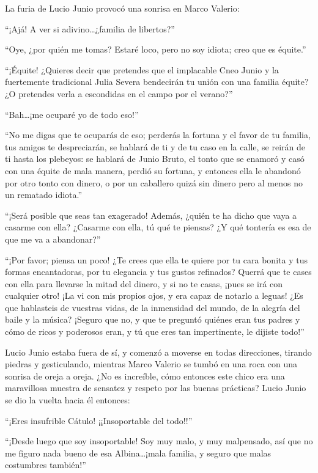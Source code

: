 \documentclass[11pt,openany]{book}
\begin{document}
La furia de Lucio Junio provocó una sonrisa en Marco Valerio:

“¡Ajá! A ver si adivino\dots ¿familia de libertos?”

“Oye, ¿por quién me tomas? Estaré loco, pero no soy idiota; creo que es équite.”

“¡Équite! ¿Quieres decir que pretendes que el implacable Cneo Junio y la fuertemente tradicional Julia Severa bendecirán tu unión con una familia équite? ¿O pretendes verla a escondidas en el campo por el verano?”

“Bah\dots ¡me ocuparé yo de todo eso!”

“No me digas que te ocuparás de eso; perderás la fortuna y el favor de tu familia, tus amigos te despreciarán, se hablará de ti y de tu caso en la calle, se reirán de ti hasta los plebeyos: se hablará de Junio Bruto, el tonto que se enamoró y casó con una équite de mala manera, perdió su fortuna, y entonces ella le abandonó por otro tonto con dinero, o por un caballero quizá sin dinero pero al menos no un rematado idiota.”

“¡Será posible que seas tan exagerado! Además, ¿quién te ha dicho que vaya a casarme con ella? ¿Casarme con ella, tú qué te piensas? ¿Y qué tontería es esa de que me va a abandonar?” 

“¡Por favor; piensa un poco! ¿Te crees que ella te quiere por tu cara bonita y tus formas encantadoras, por tu elegancia y tus gustos refinados? Querrá que te cases con ella para llevarse la mitad del dinero, y si no te casas, ¡pues se irá con cualquier otro! ¡La vi con mis propios ojos, y era capaz de notarlo a leguas! ¿Es que hablasteis de vuestras vidas, de la inmensidad del mundo, de la alegría del baile y la música? ¡Seguro que no, y que te preguntó quiénes eran tus padres y cómo de ricos y poderosos eran, y tú que eres tan impertinente, le dijiste todo!” 

Lucio Junio estaba fuera de sí, y comenzó a moverse en todas direcciones, tirando piedras y gesticulando, mientras Marco Valerio se tumbó en una roca con una sonrisa de oreja a oreja. ¿No es increíble, cómo entonces este chico era una maravillosa muestra de sensatez y respeto por las buenas prácticas? Lucio Junio se dio la vuelta hacia él entonces: 

“¡Eres insufrible Cátulo! ¡¡Insoportable del todo!!” 

“¡Desde luego que soy insoportable! Soy muy malo, y muy malpensado, así que no me figuro nada bueno de esa Albina\dots ¡mala familia, y seguro que malas costumbres también!” 
\end{document}
